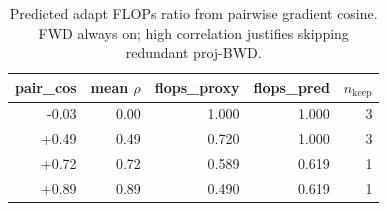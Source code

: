 \begin{table}[t]\centering
\caption{Predicted adapt FLOPs ratio from pairwise gradient cosine. FWD always on; high correlation justifies skipping redundant proj-BWD.}
\label{tab:agod-compute-ratio-corr}
\begin{tabular}{rrrrr}\toprule
pair\_cos & mean $\rho$ & flops\_proxy & flops\_pred & $n_{\mathrm{keep}}$ \\
\midrule
-0.03 & 0.00 & 1.000 & 1.000 & 3 \\
+0.49 & 0.49 & 0.720 & 1.000 & 3 \\
+0.72 & 0.72 & 0.589 & 0.619 & 1 \\
+0.89 & 0.89 & 0.490 & 0.619 & 1 \\
\bottomrule
\end{tabular}
\end{table}
